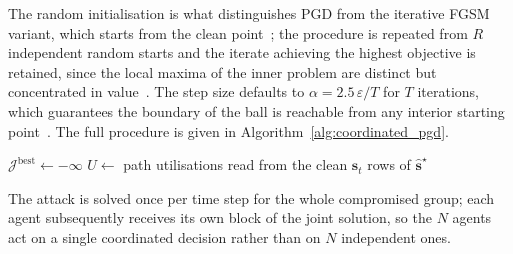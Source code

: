 The random initialisation is what distinguishes PGD from the iterative FGSM variant,
which starts from the clean point~\cite{kurakin2017adversarialmachinelearningscale};
the procedure is repeated from $R$ independent random starts and the iterate
achieving the highest objective is retained, since the local maxima of the inner
problem are distinct but concentrated in value~\cite{madry2019deeplearningmodelsresistant}.
The step size defaults to $\alpha = 2.5\,\varepsilon / T$ for $T$ iterations, which
guarantees the boundary of the ball is reachable from any interior starting
point~\cite{madry2019deeplearningmodelsresistant}. The full procedure is given in
Algorithm~\ref{alg:coordinated_pgd}.

\begin{algorithm}[H]
\SetAlgoLined
\DontPrintSemicolon
{}
$\mathcal{J}^{\text{best}} \leftarrow -\infty$\;
$U \leftarrow$ path utilisations read from the clean $\mathbf{s}_t$\;
\Return rows of $\hat{\mathbf{s}}^{\star}$\;
\caption{Coordinated multi-agent PGD (one time step)}
\label{alg:coordinated_pgd}
\end{algorithm}

The attack is solved once per time step for the whole compromised group; each agent
subsequently receives its own block of the joint solution, so the $N$ agents act on
a single coordinated decision rather than on $N$ independent ones.

